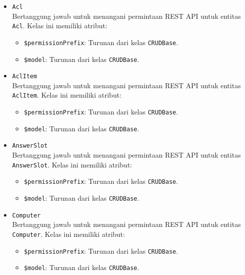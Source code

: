     \begin{itemize}
        \item \texttt{Acl}\\
            Bertanggung jawab untuk menangani permintaan REST API untuk entitas \texttt{Acl}. 
            Kelas ini memiliki atribut:
            \begin{itemize}
                \item \texttt{\$permissionPrefix}: Turunan dari kelas \texttt{CRUDBase}.
                \item \texttt{\$model}: Turunan dari kelas \texttt{CRUDBase}.
            \end{itemize}
        
        \item \texttt{AclItem}\\
            Bertanggung jawab untuk menangani permintaan REST API untuk entitas \texttt{AclItem}. 
            Kelas ini memiliki atribut:
            \begin{itemize}
                \item \texttt{\$permissionPrefix}: Turunan dari kelas \texttt{CRUDBase}.
                \item \texttt{\$model}: Turunan dari kelas \texttt{CRUDBase}.
            \end{itemize}
        
        \item \texttt{AnswerSlot}\\
            Bertanggung jawab untuk menangani permintaan REST API untuk entitas 
            \texttt{AnswerSlot}. 
            Kelas ini memiliki atribut:
            \begin{itemize}
                \item \texttt{\$permissionPrefix}: Turunan dari kelas \texttt{CRUDBase}.
                \item \texttt{\$model}: Turunan dari kelas \texttt{CRUDBase}.
            \end{itemize}
        
        \item \texttt{Computer}\\
            Bertanggung jawab untuk menangani permintaan REST API untuk entitas \texttt{Computer}. 
            Kelas ini memiliki atribut:
            \begin{itemize}
                \item \texttt{\$permissionPrefix}: Turunan dari kelas \texttt{CRUDBase}.
                \item \texttt{\$model}: Turunan dari kelas \texttt{CRUDBase}.
            \end{itemize}
        

\end{itemize}
